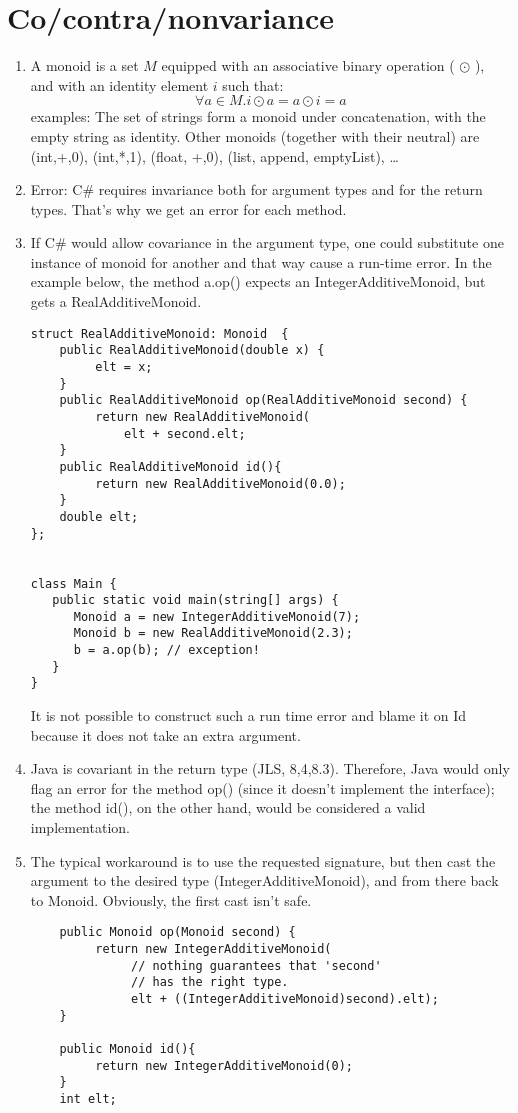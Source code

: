\documentclass{article}
\begin{document}
\section*{Co/contra/nonvariance}
\begin{enumerate}
\item A monoid is a set $M$ equipped with an associative binary operation ( $\odot$ ), and with an identity element $i$ such that:
$$\forall a \in M. i \odot a = a \odot i = a$$
examples: The set of strings form a monoid under 
concatenation, with the empty string as identity. 
Other monoids (together with their neutral) are (int,+,0), (int,*,1), (float, +,0), (list, append, emptyList), \ldots 

\item Error: C\# requires invariance both for argument types and for
the return types. That's why we get an error for each method.

\item If C\# would allow covariance in the argument type,  one
could substitute one instance of monoid for another and that way cause a run-time
error. In the example below, the method
a.op() expects an IntegerAdditiveMonoid, but gets a RealAdditiveMonoid.
\begin{verbatim}
struct RealAdditiveMonoid: Monoid  {
    public RealAdditiveMonoid(double x) {
         elt = x;
    }
    public RealAdditiveMonoid op(RealAdditiveMonoid second) {
         return new RealAdditiveMonoid(
             elt + second.elt;
    }
    public RealAdditiveMonoid id(){
         return new RealAdditiveMonoid(0.0);
    }
    double elt;
};


class Main {
   public static void main(string[] args) {
      Monoid a = new IntegerAdditiveMonoid(7);
      Monoid b = new RealAdditiveMonoid(2.3);
      b = a.op(b); // exception!
   }
}
\end{verbatim}

It is not possible to construct  such a run time error and blame it on
Id because it does not take an extra argument.

\item Java is covariant in the return type (JLS, 8,4,8.3). Therefore,
Java would only flag an error for the method op() (since it doesn't implement
the interface); the method id(), on the other hand, would be considered
a valid implementation. 

\item The typical workaround is to use the requested signature, but then
cast the argument to the desired type (IntegerAdditiveMonoid),
and from there back to Monoid. Obviously, the first cast isn't safe. 
\begin{verbatim}
    public Monoid op(Monoid second) { 
         return new IntegerAdditiveMonoid(
              // nothing guarantees that 'second'
              // has the right type.
              elt + ((IntegerAdditiveMonoid)second).elt); 
    }

    public Monoid id(){ 
         return new IntegerAdditiveMonoid(0);
    }
    int elt;
\end{verbatim}
\end{enumerate}
\end{document}
